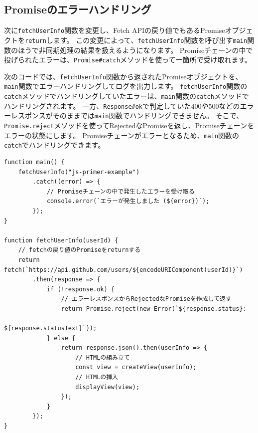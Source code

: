 \hypertarget{error-handling}{%
\subsection{Promiseのエラーハンドリング}\label{error-handling}}

次に\texttt{fetchUserInfo}関数を変更し、Fetch
APIの戻り値でもあるPromiseオブジェクトを\texttt{return}します。
この変更によって、\texttt{fetchUserInfo}関数を呼び出す\texttt{main}関数のほうで非同期処理の結果を扱えるようになります。
Promiseチェーンの中で投げられたエラーは、\texttt{Promise\#catch}メソッドを使って一箇所で受け取れます。

次のコードでは、\texttt{fetchUserInfo}関数から返されたPromiseオブジェクトを、\texttt{main}関数でエラーハンドリングしてログを出力します。
\texttt{fetchUserInfo}関数の\texttt{catch}メソッドでハンドリングしていたエラーは、\texttt{main}関数の\texttt{catch}メソッドでハンドリングされます。
一方、\texttt{Response\#ok}で判定していた400や500などのエラーレスポンスがそのままでは\texttt{main}関数でハンドリングできません。
そこで、\texttt{Promise.reject}メソッドを使ってRejectedなPromiseを返し、Promiseチェーンをエラーの状態にします。
Promiseチェーンがエラーとなるため、\texttt{main}関数の\texttt{catch}でハンドリングできます。

\begin{lstlisting}
function main() {
    fetchUserInfo("js-primer-example")
        .catch((error) => {
            // Promiseチェーンの中で発生したエラーを受け取る
            console.error(`エラーが発生しました (${error})`);
        });
}

function fetchUserInfo(userId) {
    // fetchの戻り値のPromiseをreturnする
    return fetch(`https://api.github.com/users/${encodeURIComponent(userId)}`)
        .then(response => {
            if (!response.ok) {
                // エラーレスポンスからRejectedなPromiseを作成して返す
                return Promise.reject(new Error(`${response.status}: 
                                                 ${response.statusText}`));
            } else {
                return response.json().then(userInfo => {
                    // HTMLの組み立て
                    const view = createView(userInfo);
                    // HTMLの挿入
                    displayView(view);
                });
            }
        });
}
\end{lstlisting}

